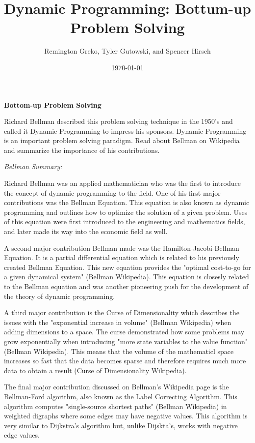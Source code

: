 \documentclass{article}
\begin{document}
\title{\textbf{Dynamic Programming: Bottum-up Problem Solving}}
\author{Remington Greko, Tyler Gutowski, and Spencer Hirsch}
\date{\today}

\maketitle

\noindent \textbf{Bottom-up Problem Solving} 


Richard Bellman described this problem solving technique in the
1950’s and called it Dynamic Programming to impress his sponsors.
Dynamic Programming is an important problem solving paradigm.
Read about Bellman on Wikipedia and summarize the importance
of his contributions.

\noindent \textit{Bellman Summary:}

Richard Bellman was an applied mathematician who was the first to 
introduce the concept of dynamic programming to the field. One of
his first major contributions was the Bellman Equation. This equation 
is also known as dynamic programming and outlines how to optimize
the solution of a given problem. Uses of this equation were first 
introduced to the engineering and mathematics fields, and later
made its way into the economic field as well.

A second major contribution Bellman made was the Hamilton-Jacobi-Bellman
Equation. It is a partial differential equation which is related to his
previously created Bellman Equation. This new equation provides the 
"optimal cost-to-go for a given dynamical system" (Bellman Wikipedia).
This equation is closesly related to the Bellman equation and was another
pioneering push for the development of the theory of dynamic programming.

A third major contribution is the Curse of Dimensionality which describes 
the issues with the "exponential increase in volume" (Bellman Wikipedia)
when adding dimensions to a space. The curse demonstrated how some 
problems may grow exponentially when introducing "more state variables 
to the value function" (Bellman Wikipedia). This means that the volume
of the mathematicl space increases so fast that the data becomes sparse
and therefore requires much more data to obtain a result (Curse of
Dimensionality Wikipedia).

The final major contribution discussed on Bellman's Wikipedia page is 
the Bellman-Ford algorithm, also known as the Label Correcting Algorithm.
This algorithm computes "single-source shortest paths" (Bellman Wikipedia)
in weighted digraphs where some edges may have negative values. This 
algorithm is very similar to Dijkstra's algorithm but, unlike Dijskta's, 
works with negative edge values.
\end{document}
